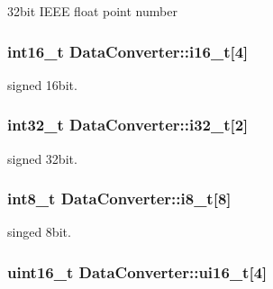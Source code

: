 32bit I\-E\-E\-E float point number 

\hypertarget{union_data_converter_ad566a31830c516b559b9a3758ad39d82}{
\subsubsection[{i16\-\_\-t}]{\setlength{\rightskip}{0pt plus 5cm}int16\-\_\-t Data\-Converter\-::i16\-\_\-t\mbox{[}4\mbox{]}}}\label{union_data_converter_ad566a31830c516b559b9a3758ad39d82}


signed 16bit. 

\hypertarget{union_data_converter_a0cf5f8f2f3ba3f3e1a1c44a21248d910}{
\subsubsection[{i32\-\_\-t}]{\setlength{\rightskip}{0pt plus 5cm}int32\-\_\-t Data\-Converter\-::i32\-\_\-t\mbox{[}2\mbox{]}}}\label{union_data_converter_a0cf5f8f2f3ba3f3e1a1c44a21248d910}


signed 32bit. 

\hypertarget{union_data_converter_a0b79bc0f32d5bc76317f226dfc1a0325}{
\subsubsection[{i8\-\_\-t}]{\setlength{\rightskip}{0pt plus 5cm}int8\-\_\-t Data\-Converter\-::i8\-\_\-t\mbox{[}8\mbox{]}}}\label{union_data_converter_a0b79bc0f32d5bc76317f226dfc1a0325}


singed 8bit. 

\hypertarget{union_data_converter_ae96584b1dad4adab583405970fc89137}{
\subsubsection[{ui16\-\_\-t}]{\setlength{\rightskip}{0pt plus 5cm}uint16\-\_\-t Data\-Converter\-::ui16\-\_\-t\mbox{[}4\mbox{]}}}\label{union_data_converter_ae96584b1dad4adab583405970fc89137}


